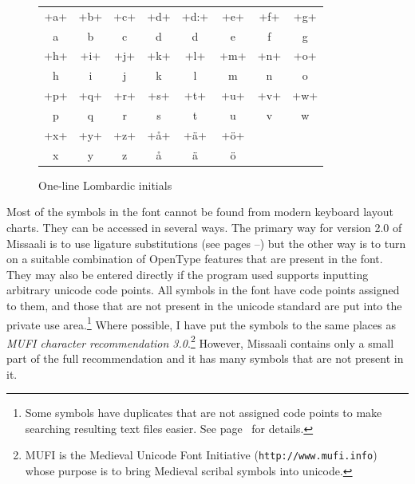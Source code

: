 \documentclass[a4paper, 12pt]{article}
\newcommand{\sample}[1]{{\mstexturafamily\fontsize{18}{18}\selectfont #1}}
\begin{document}
\begin{figure}
  \centering
  \begin{tabular}{cccccccc}
    \sample{+a+} & 
    \sample{+b+} & 
    \sample{+c+} & 
    \sample{+d+} & 
    \sample{+d:+} &
    \sample{+e+} & 
    \sample{+f+} & 
    \sample{+g+} \\
    
    a & b & c & d & d & e & f & g \\
    
    \sample{+h+} & 
    \sample{+i+} & 
    \sample{+j+} & 
    \sample{+k+} & 
    \sample{+l+} & 
    \sample{+m+} & 
    \sample{+n+} & 
    \sample{+o+} \\ 
    
    h & i & j & k & l & m & n & o \\
    
    \sample{+p+} & 
    \sample{+q+} & 
    \sample{+r+} & 
    \sample{+s+} & 
    \sample{+t+} & 
    \sample{+u+} & 
    \sample{+v+} & 
    \sample{+w+} 
     \\
    
    p & q & r & s & t & u & v & w  \\
    
    \sample{+x+} &
    \sample{+y+} & 
    \sample{+z+} & 
    \sample{+å+} & 
    \sample{+ä+} & 
    \sample{+ö+} \\
    
    x & y & z & å & ä & ö \\
    
  \end{tabular}
  \caption{One-line Lombardic initials}
  \label{fig:one_line_lombardic_initials}
\end{figure}


Most of the symbols in the font cannot be found from modern keyboard
layout charts. They can be accessed in several ways. The primary way
for version 2.0 of Missaali is to use ligature substitutions (see
pages \pageref{pg:ligatures_start}–\pageref{pg:ligatures_end}) but the
other way is to turn on a suitable combination of OpenType features
that are present in the font. They may also be entered directly if the
program used supports inputting arbitrary unicode code points. All
symbols in the font have code points assigned to them, and those that
are not present in the unicode standard are put into the private use
area.\footnote{Some symbols have duplicates that are not assigned code
  points to make searching resulting text files easier. See
  page~\pageref{pg:symbols_start} for details.} Where possible, I have
put the symbols to the same places as \emph{MUFI character
  recommendation 3.0}.\footnote{MUFI is the Medieval Unicode Font
  Initiative (\texttt{http://www.mufi.info}) whose purpose is to bring
  Medieval scribal symbols into unicode.} However, Missaali contains
only a small part of the full recommendation and it has many symbols
that are not present in it.
\end{document}
